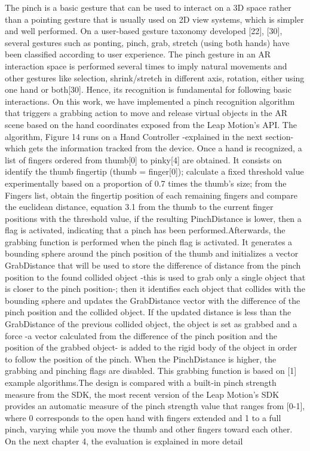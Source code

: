 The pinch is a basic gesture that can be used to interact on a 3D space rather than a pointing gesture that is usually used on 2D view systems, which is simpler and well performed. On a user-based gesture taxonomy developed [22], [30], several gestures such as ponting, pinch, grab, stretch (using both hands) have been classified according to user experience. The pinch gesture in an AR interaction space is performed several times to imply natural movements and other gestures like selection, shrink/stretch in different axis, rotation, either using one hand or both[30]. Hence, its recognition is fundamental for following basic interactions. On this work, we have implemented a pinch recognition algorithm that triggers a grabbing action to move and release virtual objects in the AR scene based on the hand coordinates exposed from the Leap Motion’s API. The algorithm, Figure 14 runs on a Hand Controller -explained in the next section- which gets the information tracked from the device. Once a hand is recognized, a list of fingers ordered from thumb[0] to pinky[4] are obtained. It consists on identify the thumb fingertip (thumb = finger[0]); calculate a fixed threshold value experimentally based on a proportion of 0.7 times the thumb’s size; from the Fingers list, obtain the fingertip position of each remaining fingers and compare the euclidean distance, equation 3.1 from the thumb to the current finger positions with the threshold value, if the resulting PinchDistance is lower, then a flag is activated, indicating that a pinch has been performed.Afterwards, the grabbing function is performed when the pinch flag is activated. It generates a bounding sphere around the pinch position of the thumb and initializes a vector GrabDistance that will be used to store the difference of distance from the pinch position to the found collided object -this is used to grab only a single object that is closer to the pinch position-; then it identifies each object that collides with the bounding sphere and updates the GrabDistance vector with the difference of the pinch position and the collided object. If the updated distance is less than the GrabDistance of the previous collided object, the object is set as grabbed and a force -a vector calculated from the difference of the pinch position and the position of the grabbed object- is added to the rigid body of the object in order to follow the position of the pinch. When the PinchDistance is higher, the grabbing and pinching flags are disabled. This grabbing function is based on [1] example algorithms.The design is compared with a built-in pinch strength measure from the SDK, the most recent version of the Leap Motion’s SDK provides an automatic measure of the pinch strength value that ranges from [0-1], where 0 corresponds to the open hand with fingers extended and 1 to a full pinch, varying while you move the thumb and other fingers toward each other. On the next chapter 4, the evaluation is explained in more detail


